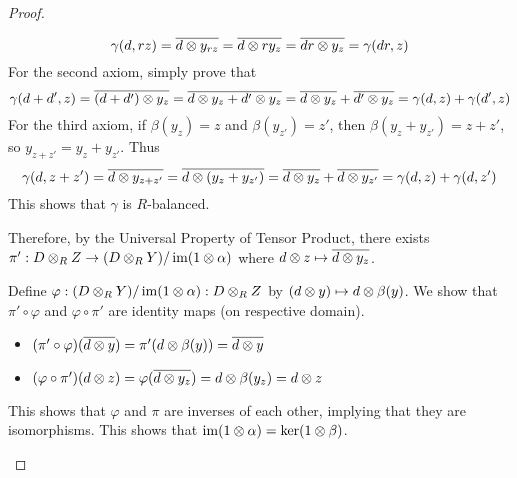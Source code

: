 \begin{proof}
\begin{enumerate}
\begin{itemize}
            \[\gamma(d,rz) = \overline{d\otimes y_{rz}}= \overline{d\otimes r y_z}= \overline{dr\otimes y_z}= \gamma(dr, z)\]
            For the second axiom, simply prove that 
            \[\gamma(d+d', z) = \overline{(d+d')\otimes y_z} = \overline{d\otimes y_z + d'\otimes y_z} = \overline{d\otimes y_z} + \overline{d'\otimes y_z} =\gamma(d,z) + \gamma(d',z) \]
            For the third axiom, if $\beta(y_z)=z$ and $\beta(y_{z'}) = z'$, then $\beta(y_z + y_{z'}) = z+z'$, so $y_{z+z'} = y_z + y_{z'}$. Thus
            \[\gamma(d, z+z') = \overline{d\otimes y_{z+z'}} = \overline{d\otimes (y_z + y_{z'})} = \overline{d\otimes y_{z}} + \overline{d\otimes y_{z'}} = \gamma(d,z) + \gamma(d,z')\]
            This shows that $\gamma$ is $R$-balanced.
        \end{itemize}
        Therefore, by the Universal Property of Tensor Product, there exists $\pi' :D\otimes_R Z \to (D\otimes_R Y)/\operatorname{im}(1\otimes \alpha)$ where $d\otimes z \mapsto \overline{d\otimes y_z}$.

        Define $\varphi: (D\otimes_R Y)/\operatorname{im}(1\otimes \alpha): D\otimes_R Z$ by $(d\otimes y)\mapsto d\otimes \beta(y)$. We show that $\pi'\circ \varphi$ and $\varphi \circ \pi'$ are identity maps (on respective domain). 
        \begin{itemize}
            \item $(\pi'\circ \varphi)(\overline{d\otimes y}) = \pi' (d\otimes \beta(y)) = \overline{d\otimes y}$
            \item $(\varphi\circ \pi')(d\otimes z)=\varphi(\overline{d\otimes y_z}) = d\otimes \beta(y_z) = d\otimes z$
        \end{itemize}
        This shows that $\varphi$ and $\pi$ are inverses of each other, implying that they are isomorphisms. This shows that $\operatorname{im}(1\otimes \alpha) = \ker(1\otimes\beta)$.
    \end{enumerate}


\end{proof}
